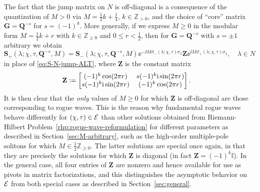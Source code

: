 \begin{remark}
The fact that the jump matrix on $N$ is off-diagonal is a consequence of the quantization of $M>0$ via $M=\tfrac{1}{2}k+\tfrac{1}{4}$, $k\in\mathbb{Z}_{>0}$, and the choice of ``core'' matrix $\mathbf{G}=\mathbf{Q}^{-s}$ for $s=(-1)^k$.  
More generally, if we express $M\ge 0$ in the modular form $M=\tfrac{1}{2}k+r$ with $k\in\mathbb{Z}_{\ge 0}$ and $0\le r<\tfrac{1}{2}$, then for $\mathbf{G}=\mathbf{Q}^{-s}$ with $s=\pm 1$ arbitrary we obtain
\begin{equation}
\mathbf{S}_+(\lambda;\chi,\tau,\mathbf{Q}^{-s},M)=
\mathbf{S}_-(\lambda;\chi,\tau,\mathbf{Q}^{-s},M)
\ee^{-\ii M\vartheta_-(\lambda;\chi,\tau)\sigma_3}\mathbf{Z}
\ee^{\ii M\vartheta_+(\lambda;\chi,\tau)\sigma_3},\quad\lambda\in N
\end{equation}
in place of \eqref{eq:S-N-jump-ALT}, where $\mathbf{Z}$ is the constant matrix
\begin{equation}
\mathbf{Z}\vcentcolon=\begin{bmatrix}
(-1)^k\cos(2\pi r) & s (-1)^k\mathrm{i}\sin(2\pi r)\\ s(-1)^k\mathrm{i}\sin(2\pi r) & (-1)^k\cos(2\pi r)\end{bmatrix}.
\end{equation}
It is then clear that the \emph{only} values of $M\ge 0$ for which $\mathbf{Z}$ is off-diagonal are those corresponding to rogue waves.  
This is the reason why fundamental rogue waves behave differently for $(\chi,\tau)\in \mathcal{E}$ than other solutions obtained from Riemann-Hilbert Problem~\ref{rhp:rogue-wave-reformulation} for different parameters as described in Section~\ref{sec:M-arbitrary}, such as the high-order multiple-pole solitons for which $M\in\tfrac{1}{2}\mathbb{Z}_{\ge 0}$.  The latter solutions are special once again, in that they are precisely the solutions for which $\mathbf{Z}$ is diagonal (in fact $\mathbf{Z}=(-1)^k\mathbb{I}$).
In the general case, all four entries of $\mathbf{Z}$ are nonzero and hence available for use as pivots in matrix factorizations, and this distinguishes the asymptotic behavior on $\mathcal{E}$ from both special cases as described in Section~\ref{sec:general}.
\label{rem:M-quantum}
\end{remark}

